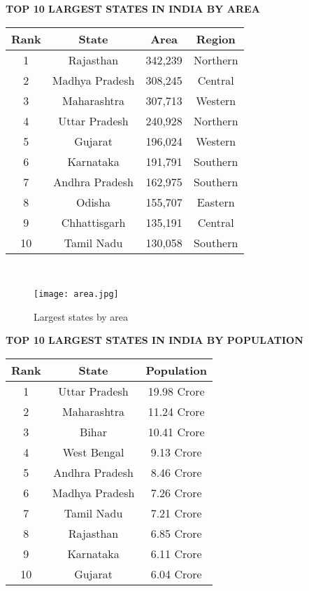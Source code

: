 \documentclass[11pt]{article}
\begin{document}
\textbf{TOP 10 LARGEST STATES IN INDIA BY AREA }\\

\begin{tabular}{ c c c c }
 Rank & State          & Area     & Region\\
 \hline 
 1    & Rajasthan      & 342,239	 & Northern\\		
 2    & Madhya Pradesh & 308,245  & Central\\	
 3    & Maharashtra	   & 307,713  &	Western\\	
 4    & Uttar Pradesh  & 240,928   & Northern	\\	
 5    & Gujarat        & 196,024   &	Western\\	
 6    & Karnataka      & 191,791   & Southern\\
 7    & Andhra Pradesh & 162,975   & Southern	\\
 8    & Odisha	       & 155,707   & Eastern\\		
 9    & Chhattisgarh    & 135,191  & Central\\	
 10   & Tamil Nadu      & 130,058  & Southern \\
\end{tabular}\\

\begin{figure}[h]
\texttt{[image: area.jpg]} \caption{Largest states by area}
\label{fig:Map of India}
\end{figure} 
\pagebreak
\textbf{TOP 10 LARGEST STATES IN INDIA BY POPULATION}\\ 

\begin{tabular}{ c c c }
Rank & State & Population\\
\hline 
1    & Uttar Pradesh  & 19.98 Crore\\		
2    & Maharashtra & 11.24 Crore\\	
3    & Bihar	   & 10.41 Crore\\	
4    & West Bengal  & 9.13 Crore\\	
5    & Andhra Pradesh  & 8.46 Crore\\	
6    & Madhya Pradesh  & 7.26 Crore\\
7    & Tamil Nadu & 7.21 Crore\\
8    & Rajasthan  & 6.85 Crore\\		
9    & Karnataka  & 6.11 Crore\\	
10   & Gujarat    &   6.04 Crore\\
\end{tabular}\\
\end{document}
